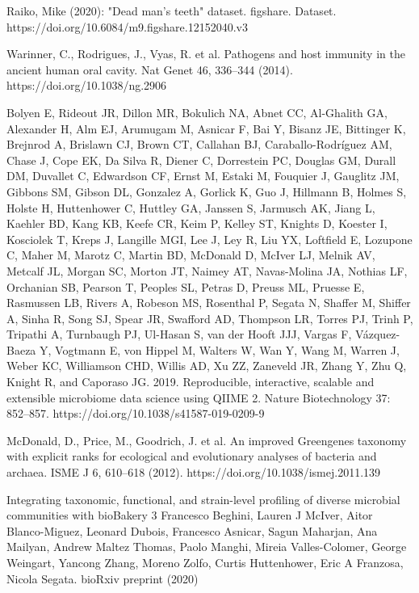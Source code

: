 \documentclass{article}
\begin{document}
\begin{thebibliography}{9}



Raiko, Mike (2020): "Dead man's teeth" dataset. figshare. Dataset. https://doi.org/10.6084/m9.figshare.12152040.v3 


	 Warinner, C., Rodrigues, J., Vyas, R. et al. Pathogens and host immunity in the ancient human oral cavity. Nat Genet 46, 336–344 (2014). https://doi.org/10.1038/ng.2906
	
	
	Bolyen E, Rideout JR, Dillon MR, Bokulich NA, Abnet CC, Al-Ghalith GA, Alexander H, Alm EJ, Arumugam M, Asnicar F, Bai Y, Bisanz JE, Bittinger K, Brejnrod A, Brislawn CJ, Brown CT, Callahan BJ, Caraballo-Rodríguez AM, Chase J, Cope EK, Da Silva R, Diener C, Dorrestein PC, Douglas GM, Durall DM, Duvallet C, Edwardson CF, Ernst M, Estaki M, Fouquier J, Gauglitz JM, Gibbons SM, Gibson DL, Gonzalez A, Gorlick K, Guo J, Hillmann B, Holmes S, Holste H, Huttenhower C, Huttley GA, Janssen S, Jarmusch AK, Jiang L, Kaehler BD, Kang KB, Keefe CR, Keim P, Kelley ST, Knights D, Koester I, Kosciolek T, Kreps J, Langille MGI, Lee J, Ley R, Liu YX, Loftfield E, Lozupone C, Maher M, Marotz C, Martin BD, McDonald D, McIver LJ, Melnik AV, Metcalf JL, Morgan SC, Morton JT, Naimey AT, Navas-Molina JA, Nothias LF, Orchanian SB, Pearson T, Peoples SL, Petras D, Preuss ML, Pruesse E, Rasmussen LB, Rivers A, Robeson MS, Rosenthal P, Segata N, Shaffer M, Shiffer A, Sinha R, Song SJ, Spear JR, Swafford AD, Thompson LR, Torres PJ, Trinh P, Tripathi A, Turnbaugh PJ, Ul-Hasan S, van der Hooft JJJ, Vargas F, Vázquez-Baeza Y, Vogtmann E, von Hippel M, Walters W, Wan Y, Wang M, Warren J, Weber KC, Williamson CHD, Willis AD, Xu ZZ, Zaneveld JR, Zhang Y, Zhu Q, Knight R, and Caporaso JG. 2019. Reproducible, interactive, scalable and extensible microbiome data science using QIIME 2. Nature Biotechnology 37: 852–857. https://doi.org/10.1038/s41587-019-0209-9 
	
	
	McDonald, D., Price, M., Goodrich, J. et al. An improved Greengenes taxonomy with explicit ranks for ecological and evolutionary analyses of bacteria and archaea. ISME J 6, 610–618 (2012). https://doi.org/10.1038/ismej.2011.139
	
Integrating taxonomic, functional, and strain-level profiling of diverse microbial communities with bioBakery 3 Francesco Beghini, Lauren J McIver, Aitor Blanco-Miguez, Leonard Dubois, Francesco Asnicar, Sagun Maharjan, Ana Mailyan, Andrew Maltez Thomas, Paolo Manghi, Mireia Valles-Colomer, George Weingart, Yancong Zhang, Moreno Zolfo, Curtis Huttenhower, Eric A Franzosa, Nicola Segata. bioRxiv preprint (2020)
	

\end{thebibliography}
\end{document}
